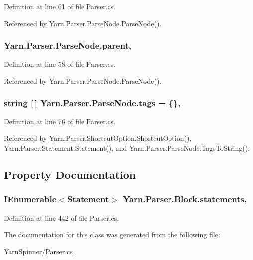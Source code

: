 Definition at line 61 of file Parser.\-cs.



Referenced by Yarn.\-Parser.\-Parse\-Node.\-Parse\-Node().

\hypertarget{a00138_af313a82103fcc2ff5a177dbb06b92f7b}{
\subsubsection[{parent}]{ Yarn.\-Parser.\-Parse\-Node.\-parent\hspace{0.3cm}{\ttfamily [package]}, {\ttfamily [inherited]}}}\label{a00138_af313a82103fcc2ff5a177dbb06b92f7b}


Definition at line 58 of file Parser.\-cs.



Referenced by Yarn.\-Parser.\-Parse\-Node.\-Parse\-Node().

\hypertarget{a00138_a58b3a15788fd2d4127d73619dc6d04ae}{
\subsubsection[{tags}]{\setlength{\rightskip}{0pt plus 5cm}string \mbox{[}$\,$\mbox{]} Yarn.\-Parser.\-Parse\-Node.\-tags = \{\}\hspace{0.3cm}{\ttfamily [package]}, {\ttfamily [inherited]}}}\label{a00138_a58b3a15788fd2d4127d73619dc6d04ae}


Definition at line 76 of file Parser.\-cs.



Referenced by Yarn.\-Parser.\-Shortcut\-Option.\-Shortcut\-Option(), Yarn.\-Parser.\-Statement.\-Statement(), and Yarn.\-Parser.\-Parse\-Node.\-Tags\-To\-String().



\subsection{Property Documentation}
\hypertarget{a00033_a42e3d555bbd5ecbdf61c45ad715be7e1}{
\subsubsection[{statements}]{\setlength{\rightskip}{0pt plus 5cm}I\-Enumerable$<${\bf Statement}$>$ Yarn.\-Parser.\-Block.\-statements\hspace{0.3cm}{\ttfamily [get]}, {\ttfamily [package]}}}\label{a00033_a42e3d555bbd5ecbdf61c45ad715be7e1}


Definition at line 442 of file Parser.\-cs.



The documentation for this class was generated from the following file\-:\begin{DoxyCompactItemize}
\item 
Yarn\-Spinner/\hyperlink{a00295}{Parser.\-cs}\end{DoxyCompactItemize}
